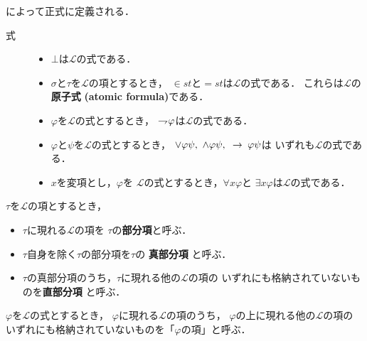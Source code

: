 	によって正式に定義される．
	
	\begin{description}
		\item[式] 
			\begin{itemize}
				\item $\bot$は$\mathcal{L}$の式である．
				\item $\sigma$と$\tau$を$\mathcal{L}$の項とするとき，
					$\in st$と$=st$は$\mathcal{L}$の式である．
					これらは$\mathcal{L}$の{\bf 原子式}
					{\bf (atomic formula)}である．
				\item $\varphi$を$\mathcal{L}$の式とするとき，
					$\rightharpoondown\hspace{-0.25em} \varphi$は$\mathcal{L}$の式である．
				\item $\varphi$と$\psi$を$\mathcal{L}$の式とするとき，
					$\vee \varphi \psi,\ \wedge \varphi \psi,\ \rarrow \varphi \psi$は
					いずれも$\mathcal{L}$の式である．
				\item $x$を変項とし，$\varphi$を
					$\mathcal{L}$の式とするとき，$\forall x \varphi$と
					$\exists x \varphi$は$\mathcal{L}$の式である．
			\end{itemize}
	\end{description}
	
	\begin{screen}
		\begin{metadfn}\label{metadfn:L_subterm_of_term}
			$\tau$を$\mathcal{L}$の項とするとき，
			\begin{itemize}
				\item $\tau$に現れる$\mathcal{L}$の項を
					$\tau$の{\bf 部分項}と呼ぶ．
				\item $\tau$自身を除く$\tau$の部分項を$\tau$の
					{\bf 真部分項}
					と呼ぶ．
				\item $\tau$の真部分項のうち，$\tau$に現れる他の$\mathcal{L}$の項の
					いずれにも格納されていないものを{\bf 直部分項}
					と呼ぶ．
			\end{itemize}
		\end{metadfn}
	\end{screen}
	
	\begin{screen}
		\begin{metadfn}
		\label{metadfn:L_term_of_formula}
			$\varphi$を$\mathcal{L}$の式とするとき，
			$\varphi$に現れる$\mathcal{L}$の項のうち，
			$\varphi$の上に現れる他の$\mathcal{L}$の項の
			いずれにも格納されていないものを「$\varphi$の項」と呼ぶ．
		\end{metadfn}
	\end{screen}
	
